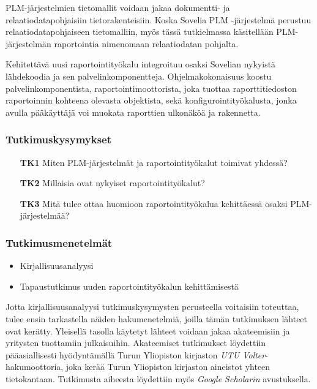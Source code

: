 PLM-järjestelmien tietomallit voidaan jakaa dokumentti- ja relaatiodatapohjaisiin tietorakenteisiin. \cite{david_what_2016} Koska Sovelia PLM -järjestelmä perustuu relaatiodatapohjaiseen tietomalliin, myös tässä tutkielmassa käsitellään PLM-järjestelmän raportointia nimenomaan relaatiodatan pohjalta.

Kehitettävä uusi raportointityökalu integroituu osaksi Sovelian nykyistä lähdekoodia ja sen palvelinkomponentteja. Ohjelmakokonaisuus koostu palvelinkomponentista, raportointimoottorista, joka tuottaa raporttitiedoston raportoinnin kohteena olevasta objektista, sekä konfigurointityökalusta, jonka avulla pääkäyttäjä voi muokata raporttien ulkonäköä ja rakennetta.

\subsubsection{Tutkimuskysymykset}
\begin{itemize}
\item[\textbf{TK1}] Miten PLM-järjestelmät ja raportointityökalut toimivat yhdessä?
\item[\textbf{TK2}] Millaisia ovat nykyiset raportointityökalut?
\item[\textbf{TK3}] Mitä tulee ottaa huomioon raportointityökalua kehittäessä osaksi PLM-järjestelmää?
\end{itemize}

\subsubsection{Tutkimusmenetelmät}
\begin{itemize}
\item Kirjallisuusanalyysi
\item Tapaustutkimus uuden raportointityökalun kehittämisestä
\end{itemize}

Jotta kirjallisuusanalyysi tutkimuskysymysten perusteella voitaisiin toteuttaa, tulee ensin tarkastella näiden hakumenetelmiä, joilla tämän tutkimuksen lähteet ovat kerätty. Yleisellä tasolla käytetyt lähteet voidaan jakaa akateemisiin ja yritysten tuottamiin julkaisuihin. Akateemiset tutkimukset löydettiin pääasiallisesti hyödyntämällä Turun Yliopiston kirjaston \textit{UTU Volter}-hakumoottoria, joka kerää Turun Yliopiston kirjaston aineistot yhteen tietokantaan. Tutkimusta aiheesta löydettiin myös \textit{Google Scholarin} avustuksella. 


